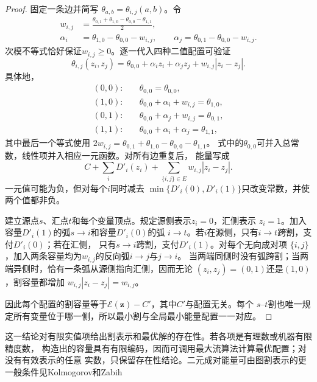 \begin{proof}
固定一条边并简写
\(\theta_{a,b}=\theta_{i,j}(a,b)\)。令
\begin{align}
  w_{i,j}&=\frac{
    \theta_{0,1}+\theta_{1,0}
    -\theta_{0,0}-\theta_{1,1}
  }{2},
  \label{eq:graph-theory-cut-pair-weight}\\
  \alpha_i&=\theta_{1,0}-\theta_{0,0}-w_{i,j},
  \qquad \alpha_j=
  \theta_{0,1}-\theta_{0,0}-w_{i,j}.
  \label{eq:graph-theory-cut-unary-shifts}
\end{align}
次模不等式恰好保证\(w_{i,j}\geq0\)。逐一代入四种二值配置可验证
\begin{equation}
  \theta_{i,j}(z_i,z_j)=
  \theta_{0,0}+\alpha_i z_i+\alpha_j z_j+
  w_{i,j}|z_i-z_j|.
  \label{eq:graph-theory-pairwise-cut-decomposition}
\end{equation}
具体地，
\begin{align*}
  (0,0):\quad&
  \theta_{0,0}=\theta_{0,0},\\
  (1,0):\quad&
  \theta_{0,0}+\alpha_i+w_{i,j}=\theta_{1,0},\\
  (0,1):\quad&
  \theta_{0,0}+\alpha_j+w_{i,j}=\theta_{0,1},\\
  (1,1):\quad&
  \theta_{0,0}+\alpha_i+\alpha_j
  =\theta_{1,1},
\end{align*}
其中最后一个等式使用
\(2w_{i,j}=\theta_{0,1}+\theta_{1,0}-\theta_{0,0}-\theta_{1,1}\)。
式中的\(\theta_{0,0}\)可并入总常数，线性项并入相应一元函数。对所有边重复后，
能量写成
\[
  C+\sum_i D'_i(z_i)
  +\sum_{\{i,j\}\in E}w_{i,j}|z_i-z_j|.
\]
一元值可能为负，但对每个\(i\)同时减去
\(\min\{D'_i(0),D'_i(1)\}\)只改变常数，并使两个值都非负。

建立源点\(s\)、汇点\(t\)和每个变量顶点。规定源侧表示\(z_i=0\)，汇侧表示
\(z_i=1\)。加入容量\(D'_i(1)\)的弧\(s\to i\)和容量\(D'_i(0)\)的弧
\(i\to t\)。若\(i\)在源侧，只有\(i\to t\)跨割，支付\(D'_i(0)\)；若在汇侧，
只有\(s\to i\)跨割，支付\(D'_i(1)\)。对每个无向成对项
\(\{i,j\}\)，加入两条容量均为\(w_{i,j}\)的反向弧\(i\to j\)与\(j\to i\)。
当两端同侧时没有弧跨割；当两端异侧时，恰有一条弧从源侧指向汇侧，因而无论
\((z_i,z_j)=(0,1)\)还是\((1,0)\)，割容量都增加
\(w_{i,j}|z_i-z_j|=w_{i,j}\)。

因此每个配置的割容量等于\(\mathcal{E}(\bm{z})-C'\)，其中\(C'\)与配置无关。每个
\(s\)--\(t\)割也唯一规定所有变量位于哪一侧，所以最小割与全局最小能量配置一一对应。
\end{proof}

这一结论对有限实值项给出割表示和最优解的存在性。若各项是有理数或机器有限精度数，
构造出的容量具有有限编码，因而可调用最大流算法计算最优配置；对没有有效表示的任意
实数，只保留存在性结论。二元成对能量可由图割表示的更一般条件见Kolmogorov和Zabih

